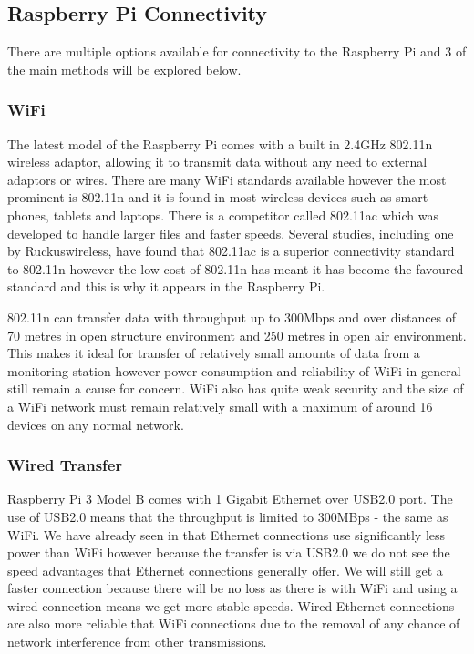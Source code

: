 \documentclass[10pt,a4paper]{article}
\begin{document}
\subsection{Raspberry Pi Connectivity}
There are multiple options available for connectivity to the Raspberry Pi and 3 of the main methods will be explored below.
\subsubsection{WiFi} 
The latest model of the Raspberry Pi comes with a built in 2.4GHz 802.11n wireless adaptor, allowing it to transmit data without any need to external adaptors or wires. There are many WiFi standards available however the most prominent is 802.11n and it is found in most wireless devices such as smart-phones, tablets and laptops. There is a competitor called 802.11ac which was developed to handle larger files and faster speeds. Several studies, including one by Ruckuswireless\cite{Ruckus2014}, have found that 802.11ac is a superior connectivity standard to 802.11n however the low cost of 802.11n has meant it has become the favoured standard and this is why it appears in the Raspberry Pi. 

802.11n can transfer data with throughput up to 300Mbps and over distances of 70 metres in open structure environment and 250 metres in open air environment\cite{Kaewkiriya2017}. This makes it ideal for transfer of relatively small amounts of data from a monitoring station however power consumption and reliability of WiFi in general still remain a cause for concern. WiFi also has quite weak security and the size of a WiFi network must remain relatively small with a maximum of around 16 devices on any normal network.  
\subsubsection{Wired Transfer}
Raspberry Pi 3 Model B comes with 1 Gigabit Ethernet over USB2.0 port. The use of USB2.0 means that the throughput is limited to 300MBps - the same as WiFi. We have already seen in\cite{Kaup2014} that Ethernet connections use significantly less power than WiFi however because the transfer is via USB2.0 we do not see the speed advantages that Ethernet connections generally offer. We will still get a faster connection because there will be no loss as there is with WiFi and using a wired connection means we get more stable speeds. Wired Ethernet connections are also more reliable that WiFi connections due to the removal of any chance of network interference from other transmissions.
\end{document}

